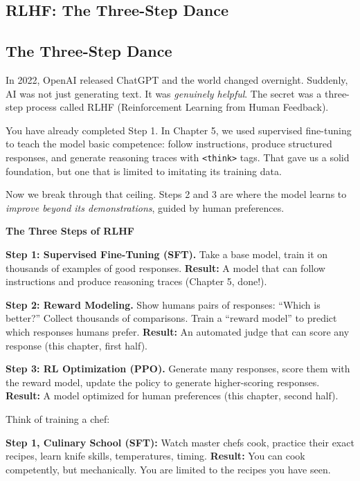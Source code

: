 \begin{chapterenv}

\chapter{RLHF: The Three-Step Dance}

\section{The Three-Step Dance}

In 2022, OpenAI released ChatGPT and the world changed overnight. Suddenly, AI was not just generating text. It was \textit{genuinely helpful}. The secret was a three-step process called RLHF (Reinforcement Learning from Human Feedback).

You have already completed Step 1. In Chapter 5, we used supervised fine-tuning to teach the model basic competence: follow instructions, produce structured responses, and generate reasoning traces with \texttt{<think>} tags. That gave us a solid foundation, but one that is limited to imitating its training data.

Now we break through that ceiling. Steps 2 and 3 are where the model learns to \textit{improve beyond its demonstrations}, guided by human preferences.

\begin{infobox}
\textbf{The Three Steps of RLHF}

\textbf{Step 1: Supervised Fine-Tuning (SFT).} Take a base model, train it on thousands of examples of good responses. \textbf{Result:} A model that can follow instructions and produce reasoning traces (Chapter 5, done!).

\textbf{Step 2: Reward Modeling.} Show humans pairs of responses: ``Which is better?'' Collect thousands of comparisons. Train a ``reward model'' to predict which responses humans prefer. \textbf{Result:} An automated judge that can score any response (this chapter, first half).

\textbf{Step 3: RL Optimization (PPO).} Generate many responses, score them with the reward model, update the policy to generate higher-scoring responses. \textbf{Result:} A model optimized for human preferences (this chapter, second half).
\end{infobox}

\begin{infobox}
Think of training a chef:

\textbf{Step 1, Culinary School (SFT):} Watch master chefs cook, practice their exact recipes, learn knife skills, temperatures, timing. \textbf{Result:} You can cook competently, but mechanically. You are limited to the recipes you have seen.


\end{infobox}
\end{chapterenv}
